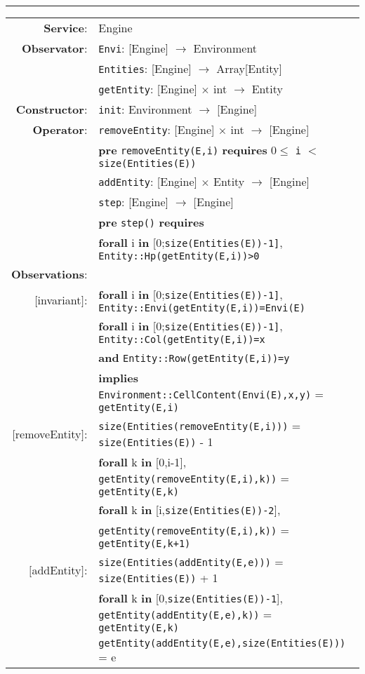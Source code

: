 \documentclass[11pt]{article}
\begin{document}
\vspace{5mm}\hrule\vspace{5mm}

\begin{tabular}{rl}
\textbf{Service}: & Engine \\
\textbf{Observator}: & \texttt{Envi}: \textrm{[Engine]} $\rightarrow$ \textrm{Environment} \\
& \texttt{Entities}: \textrm{[Engine]} $\rightarrow$ \textrm{Array[Entity]} \\
& \texttt{getEntity}: \textrm{[Engine]} $\times$ \textrm{int} $\rightarrow$ \textrm{Entity} \\
\textbf{Constructor}: & \texttt{init}: \textrm{Environment} $\rightarrow$ \textrm{[Engine]}\\
\textbf{Operator}: & 
\texttt{removeEntity}: \textrm{[Engine]} $\times$ \textrm{int} $\rightarrow$ \textrm{[Engine]} \\
& \quad \textbf{pre} \texttt{removeEntity(E,i)} \textbf{requires} $0 \leq$ \texttt{i} $<$ \texttt{size(Entities(E))} \\
& \texttt{addEntity}: \textrm{[Engine]} $\times$ \textrm{Entity} $\rightarrow$ \textrm{[Engine]} \\
& \texttt{step}: \textrm{[Engine]} $\rightarrow$ \textrm{[Engine]}\\
& \quad \textbf{pre} \texttt{step()} \textbf{requires}\\
&
\quad \textbf{forall} i \textbf{in} [0;\texttt{size(Entities(E))-1]}, \texttt{Entity::Hp(getEntity(E,i))>0} \\
\textbf{Observations}: & \\
$[$invariant$]$: & \textbf{forall} i \textbf{in} [0;\texttt{size(Entities(E))-1]}, \texttt{Entity::Envi(getEntity(E,i))=Envi(E)} \\
& \textbf{forall} i \textbf{in} [0;\texttt{size(Entities(E))-1]}, \texttt{Entity::Col(getEntity(E,i))=x} \\ & \quad\quad\quad\quad\textbf{and} \texttt{Entity::Row(getEntity(E,i))=y} \\
& \quad\quad\quad\quad \textbf{implies} \texttt{Environment::CellContent(Envi(E),x,y)} = \texttt{getEntity(E,i)}  \\
$[$removeEntity$]$: & \texttt{size(Entities(removeEntity(E,i)))} = \texttt{size(Entities(E))} - 1 \\
& \textbf{forall} k \textbf{in} [0,i-1], \texttt{getEntity(removeEntity(E,i),k))} = \texttt{getEntity(E,k)} \\
& \textbf{forall} k \textbf{in} [i,\texttt{size(Entities(E))-2}],
\\
& \quad \texttt{getEntity(removeEntity(E,i),k))} = \texttt{getEntity(E,k+1)} \\
$[$addEntity$]$: & \texttt{size(Entities(addEntity(E,e)))} = \texttt{size(Entities(E))} + 1 \\
& \textbf{forall} k \textbf{in} [0,\texttt{size(Entities(E))-1}], \texttt{getEntity(addEntity(E,e),k))} = \texttt{getEntity(E,k)} \\
& \texttt{getEntity(addEntity(E,e),size(Entities(E)))} = e 
\end{tabular}
\end{document}
